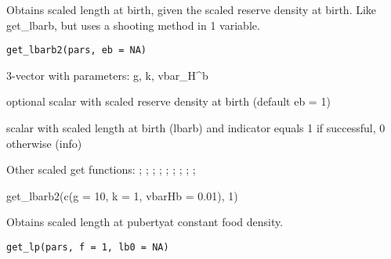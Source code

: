 \documentclass[a4paper]{book}
\begin{document}
%
\begin{Description}\relax
Obtains scaled length at birth, given the scaled reserve density at birth. Like get\_lbarb, but uses a shooting method in 1 variable.
\end{Description}
%
\begin{Usage}
\begin{verbatim}
get_lbarb2(pars, eb = NA)
\end{verbatim}
\end{Usage}
%
\begin{Arguments}
\begin{ldescription}
\item[\code{pars}] 3-vector with parameters: g, k, vbar\_H\textasciicircum{}b

\item[\code{eb}] optional scalar with scaled reserve density at birth (default eb = 1)
\end{ldescription}
\end{Arguments}
%
\begin{Value}
scalar with scaled length at birth (lbarb) and indicator equals 1 if successful, 0 otherwise (info)
\end{Value}
%
\begin{SeeAlso}\relax
Other scaled get functions: ;
; ;
; ;
; ;
;
;
\end{SeeAlso}
%
\begin{Examples}
\begin{ExampleCode}
get_lbarb2(c(g = 10, k = 1, vbarHb = 0.01), 1)
\end{ExampleCode}
\end{Examples}
%
\begin{Description}\relax
Obtains scaled length at pubertyat constant food density.
\end{Description}
%
\begin{Usage}
\begin{verbatim}
get_lp(pars, f = 1, lb0 = NA)
\end{verbatim}
\end{Usage}
\end{document}
